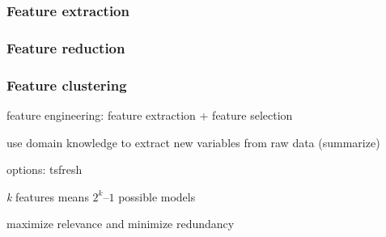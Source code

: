 \subsubsection{Feature extraction}

\subsubsection{Feature reduction}

\subsubsection{Feature clustering}

feature engineering: feature extraction + feature selection

use domain knowledge to extract new variables from raw data (summarize)

options: tsfresh \citep[][]{christ2018}

\textit{k} features means \(2^k – 1\) possible models

maximize relevance and minimize redundancy
